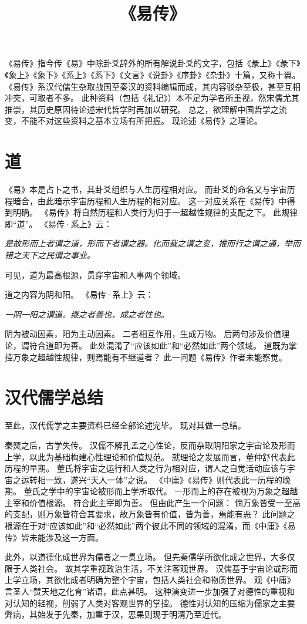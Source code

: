 \documentclass[11pt]{article}
\title{《易传》}
\date{}
\begin{document}
  \maketitle

  \linenumbers
《易传》指今传《易》中除卦爻辞外的所有解说卦爻的文字，包括《彖上》《彖下》《象上》《象下》《系上》《系下》《文言》《说卦》《序卦》《杂卦》十篇，又称十翼。
《易传》系汉代儒生杂取战国至秦汉的资料编辑而成，其内容驳杂至极，甚至互相冲突，可取者不多。
此种资料（包括《礼记》）本不足为学者所重视，然宋儒尤其推崇，其历史原因待论述宋代哲学时再加以研究。
总之，欲理解中国哲学之流变，不能不对这些资料之基本立场有所把握。
现论述《易传》之理论。

\section{道}
《易》本是占卜之书，其卦爻组织与人生历程相对应。
而卦爻的命名又与宇宙历程暗合，由此暗示宇宙历程和人生历程的相对应。
这一对应关系在《易传》中得到明确。
《易传》将自然历程和人类行为归于一超越性规律的支配之下。
此规律即“道”。
《易传·系上》云：

\textit{是故形而上者谓之道，形而下者谓之器。化而裁之谓之变，推而行之谓之通，举而错之天下之民谓之事业。}

可见，道为最高根源，贯穿宇宙和人事两个领域。

\newline

道之内容为阴和阳。
《易传·系上》云：
    
\textit{一阴一阳之谓道。继之者善也，成之者性也。}

阴为被动因素，阳为主动因素。
二者相互作用，生成万物。
后两句涉及价值理论，谓符合道即为善。
此处混淆了“应该如此”和“必然如此”两个领域。
道既为掌控万象之超越性规律，则焉能有不继道者？
此一问题《易传》作者未能察觉。

\section{汉代儒学总结}
至此，汉代儒学之主要资料已经全部论述完毕。
现对其做一总结。

\newline

秦燹之后，古学失传。
汉儒不解孔孟之心性论，反而杂取阴阳家之宇宙论及形而上学，以此为基础构建心性理论和价值规范。
就理论之发展而言，董仲舒代表此历程的早期。
董氏将宇宙之运行和人类之行为相对应，谓人之自觉活动应该与宇宙之运转相一致，遂兴“天人一体”之说。
《中庸》《易传》则代表此一历程的晚期。
董氏之学中的宇宙论被形而上学所取代。
一形而上的存在被视为万象之超越主宰和价值根源。
符合此主宰即为善。
但由此产生一个问题：
倘万象皆受一至高的支配，则万象皆符合其要求，故万象皆有价值，皆为善，焉能有恶？
此问题之根源在于对“应该如此”和“必然如此”两个彼此不同的领域的混淆，而《中庸》《易传》皆未能涉及这一方面。

\newline

此外，以道德化成世界为儒者之一贯立场。
但先秦儒学所欲化成之世界，大多仅限于人类社会。
故其学重视政治生活，不关注客观世界。
汉儒基于宇宙论或形而上学立场，其欲化成者明确为整个宇宙，包括人类社会和物质世界。
观《中庸》言圣人“赞天地之化育”诸语，此点甚明。
这种演变进一步加强了对德性的重视和对认知的轻视，削弱了人类对客观世界的掌控。
德性对认知的压缩为儒家之主要弊病，其始发于先秦，加重于汉，恶果则现于明清乃至近代。
 
\end{document}
